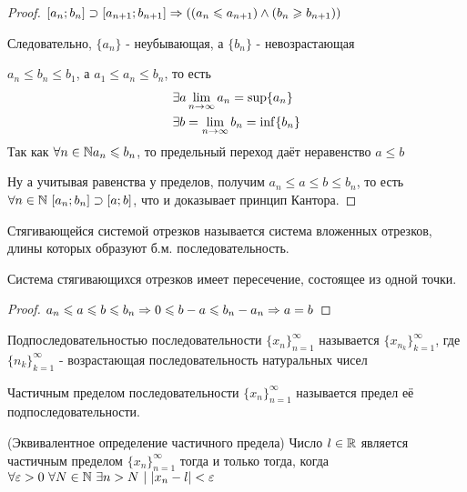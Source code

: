 \begin{proof}
	$[a_n; b_n] \supset [a_{n + 1}; b_{n + 1}] \Rightarrow \left((a_n \leqslant a_{n + 1}) \wedge (b_n \geqslant b_{n + 1})\right)$
	
	Следовательно, $\{a_n\}$ - неубывающая, а $\{b_n\}$ - невозрастающая
	
	$a_n \le b_n \le b_1$, а $a_1 \le a_n \le b_n$, то есть
	\begin{align*}
		&\exists a \lim\limits_{n \rightarrow \infty} a_n = \sup \{a_n\}
		\\
		&\exists b = \lim\limits_{n \rightarrow \infty} b_n = \inf \{b_n\}
	\end{align*}
	Так как $\forall n \in \mathbb{N} a_n \leqslant b_n$, то предельный переход даёт неравенство $a \le b$
	
	Ну а учитывая равенства у пределов, получим $a_n \le a \le b \le b_n$, то есть $\forall n \in \mathbb{N}\ [a_n; b_n] \supset [a; b]$, что и доказывает принцип Кантора.
\end{proof}

\begin{definition}
	Стягивающейся системой отрезков называется система вложенных отрезков, длины которых образуют б.м. последовательность.
\end{definition}

\begin{addition}
	Система стягивающихся отрезков имеет пересечение, состоящее из одной точки.
\end{addition}

\begin{proof}
	$a_n \leqslant a \leqslant b \leqslant b_n \Rightarrow 0 \leqslant b - a \leqslant b_n - a_n \Rightarrow a = b$
\end{proof}

\begin{definition}
	Подпоследовательностью последовательности $\{x_n\}_{n = 1}^\infty$ называется $\{x_{n_k}\}_{k = 1}^\infty$, где $\{n_k\}_{k = 1}^\infty$ - возрастающая последовательность натуральных чисел
\end{definition}

\begin{definition}
	Частичным пределом последовательности $\{x_n\}_{n = 1}^\infty$ называется предел её подпоследовательности.
\end{definition}

\begin{theorem} (Эквивалентное определение частичного предела)
	Число $l \in \mathbb{R}$ является частичным пределом $\{x_n\}_{n = 1}^\infty$ тогда и только тогда, когда $\forall \varepsilon > 0\ \forall N \in \mathbb{N}\ \exists n > N\ |\ |x_n - l| < \varepsilon$
\end{theorem}


